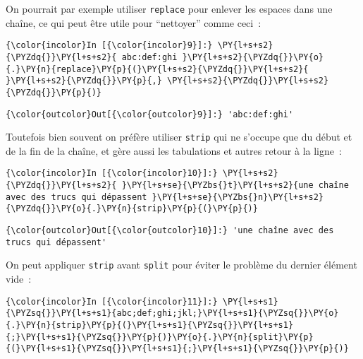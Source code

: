     On pourrait par exemple utiliser \texttt{replace} pour enlever les
espaces dans une chaîne, ce qui peut être utile pour ``nettoyer'' comme
ceci~:

    \begin{Verbatim}[commandchars=\\\{\},frame=single,framerule=0.3mm,rulecolor=\color{cellframecolor}]
{\color{incolor}In [{\color{incolor}9}]:} \PY{l+s+s2}{\PYZdq{}}\PY{l+s+s2}{ abc:def:ghi }\PY{l+s+s2}{\PYZdq{}}\PY{o}{.}\PY{n}{replace}\PY{p}{(}\PY{l+s+s2}{\PYZdq{}}\PY{l+s+s2}{ }\PY{l+s+s2}{\PYZdq{}}\PY{p}{,} \PY{l+s+s2}{\PYZdq{}}\PY{l+s+s2}{\PYZdq{}}\PY{p}{)}
\end{Verbatim}


\begin{Verbatim}[commandchars=\\\{\},frame=single,framerule=0.3mm,rulecolor=\color{cellframecolor}]
{\color{outcolor}Out[{\color{outcolor}9}]:} 'abc:def:ghi'
\end{Verbatim}
            
    Toutefois bien souvent on préfère utiliser \texttt{strip} qui ne
s'occupe que du début et de la fin de la chaîne, et gère aussi les
tabulations et autres retour à la ligne~:

    \begin{Verbatim}[commandchars=\\\{\},frame=single,framerule=0.3mm,rulecolor=\color{cellframecolor}]
{\color{incolor}In [{\color{incolor}10}]:} \PY{l+s+s2}{\PYZdq{}}\PY{l+s+s2}{ }\PY{l+s+se}{\PYZbs{}t}\PY{l+s+s2}{une chaîne avec des trucs qui dépassent }\PY{l+s+se}{\PYZbs{}n}\PY{l+s+s2}{\PYZdq{}}\PY{o}{.}\PY{n}{strip}\PY{p}{(}\PY{p}{)}
\end{Verbatim}


\begin{Verbatim}[commandchars=\\\{\},frame=single,framerule=0.3mm,rulecolor=\color{cellframecolor}]
{\color{outcolor}Out[{\color{outcolor}10}]:} 'une chaîne avec des trucs qui dépassent'
\end{Verbatim}
            
    On peut appliquer \texttt{strip} avant \texttt{split} pour éviter le
problème du dernier élément vide~:

    \begin{Verbatim}[commandchars=\\\{\},frame=single,framerule=0.3mm,rulecolor=\color{cellframecolor}]
{\color{incolor}In [{\color{incolor}11}]:} \PY{l+s+s1}{\PYZsq{}}\PY{l+s+s1}{abc;def;ghi;jkl;}\PY{l+s+s1}{\PYZsq{}}\PY{o}{.}\PY{n}{strip}\PY{p}{(}\PY{l+s+s1}{\PYZsq{}}\PY{l+s+s1}{;}\PY{l+s+s1}{\PYZsq{}}\PY{p}{)}\PY{o}{.}\PY{n}{split}\PY{p}{(}\PY{l+s+s1}{\PYZsq{}}\PY{l+s+s1}{;}\PY{l+s+s1}{\PYZsq{}}\PY{p}{)}
\end{Verbatim}


